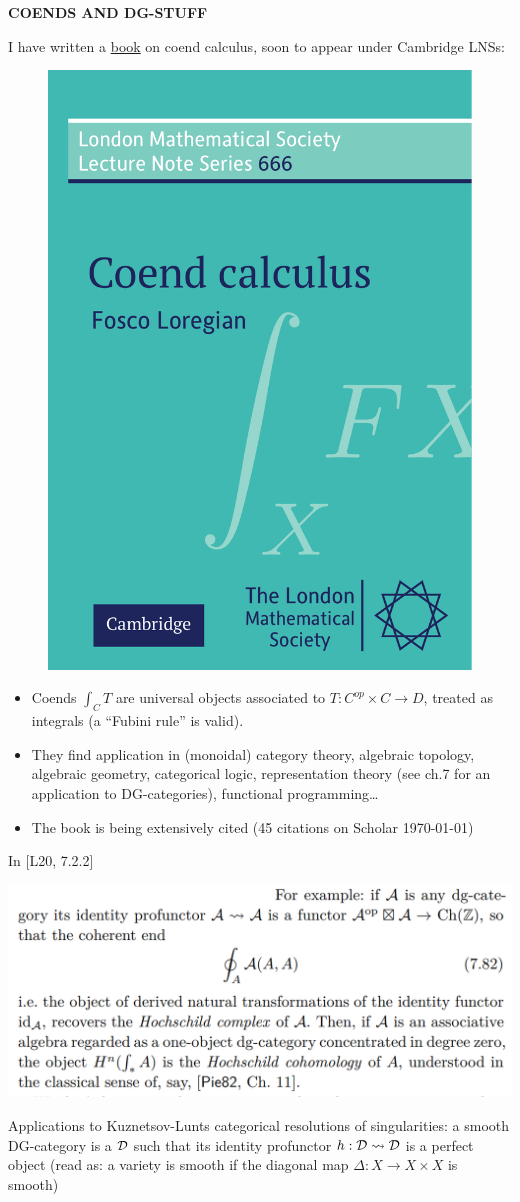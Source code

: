 \documentclass{beamer}
\begin{document}
%
%
%
%
%
%
\begin{frame}
  \Huge\centering \bfseries COENDS AND DG-STUFF
\end{frame}
%
\begin{frame}
  I have written a \href{https://arxiv.org/pdf/1501.02503}{book} on \alert{coend calculus}, soon to appear under Cambridge LNSs:
\begin{figure}
  \includegraphics[width=.35\textwidth]{cover-2-.pdf}
\end{figure}
\small
\begin{itemize}
  \item<+-> Coends $\int_C T$ are universal objects associated to $T : C^{op}\times C \to D$, treated as integrals (a ``Fubini rule'' is valid).
  \item<+-> They find application in (monoidal) category theory, algebraic topology, algebraic geometry, categorical logic, representation theory (see ch.7 for an application to \alert{DG-categories}), functional programming\dots
  \item<+-> The book is being extensively cited (45 citations on Scholar \today)
\end{itemize}
\end{frame}
%
%
%
%
\begin{frame}
  In [\alert{L20}, 7.2.2]
  \begin{center}
  \includegraphics[width=.75\textwidth]{dg.png}
  \end{center}
  Applications to Kuznetsov-Lunts \alert{categorical resolutions of singularities}: a smooth DG-category is a $\cal D$ such that its identity profunctor $h : {\cal D} \rightsquigarrow \cal D$ is a perfect object (read as: a variety is smooth if the diagonal map $\Delta : X \to X\times X$ is smooth)
\end{frame}
\end{document}
